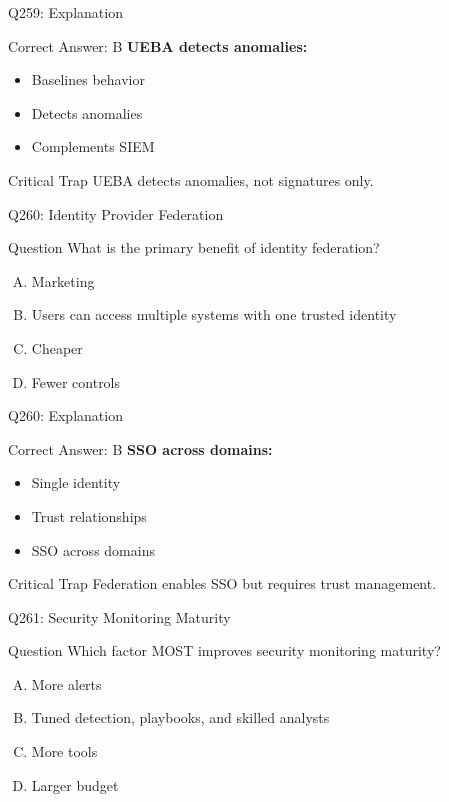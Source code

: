 \documentclass{beamer}
\begin{document}
	\begin{frame}{Q259: Explanation}
		\begin{block}{Correct Answer: B}
			\textbf{UEBA detects anomalies:}
			\begin{itemize}
				\item Baselines behavior
				\item Detects anomalies
				\item Complements SIEM
			\end{itemize}
		\end{block}
		\begin{alertblock}{Critical Trap}
			UEBA detects anomalies, not signatures only.
		\end{alertblock}
	\end{frame}
	
	\begin{frame}{Q260: Identity Provider Federation}
		\begin{block}{Question}
			What is the primary benefit of identity federation?
		\end{block}
		\begin{enumerate}[(A)]
			\item Marketing
			\item Users can access multiple systems with one trusted identity
			\item Cheaper
			\item Fewer controls
		\end{enumerate}
	\end{frame}
	
	\begin{frame}{Q260: Explanation}
		\begin{block}{Correct Answer: B}
			\textbf{SSO across domains:}
			\begin{itemize}
				\item Single identity
				\item Trust relationships
				\item SSO across domains
			\end{itemize}
		\end{block}
		\begin{alertblock}{Critical Trap}
			Federation enables SSO but requires trust management.
		\end{alertblock}
	\end{frame}
	
	\begin{frame}{Q261: Security Monitoring Maturity}
		\begin{block}{Question}
			Which factor MOST improves security monitoring maturity?
		\end{block}
		\begin{enumerate}[(A)]
			\item More alerts
			\item Tuned detection, playbooks, and skilled analysts
			\item More tools
			\item Larger budget
		\end{enumerate}
	\end{frame}
	
\end{document}
